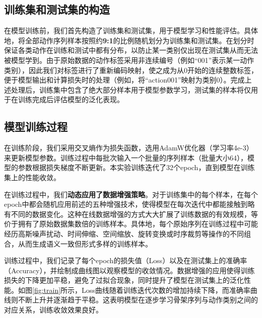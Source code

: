 \documentclass[UTF8]{article}
\begin{document}
\subsection{训练集和测试集的构造}

在模型训练前，我们首先构造了训练集和测试集，用于模型学习和性能评估。具体地，将全部动作序列样本按照约\textbf{9:1}的比例随机划分为训练集和测试集。在划分时保证各类动作在训练和测试中都有分布，以防止某一类别仅出现在测试集从而无法被模型学到。由于原始数据的动作标签采用非连续编号（例如``001''表示某一动作类别），因此我们对标签进行了重新编码映射，使之成为从0开始的连续整数标签，便于模型输出和计算损失时的处理（例如，将``action001''映射为类别0）。完成上述处理后，训练集中包含了绝大部分样本用于模型参数学习，测试集的样本将仅用于在训练完成后评估模型的泛化表现。

\subsection{模型训练过程}

在训练阶段，我们采用交叉熵作为损失函数，选用AdamW优化器（学习率4e-3）来更新模型参数。训练过程中每批次输入一个批量的序列样本（批量大小64），模型的参数根据损失梯度不断更新。本实验训练迭代了32个epoch，直到模型在训练集上的性能收敛。

在训练过程中，我们\textbf{动态应用了数据增强策略}。对于训练集中的每个样本，在每个epoch中都会随机应用前述的五种增强技术，使得模型在每次迭代中都能接触到略有不同的数据变化。这种在线数据增强的方式大大扩展了训练数据的有效规模，等价于拥有了原始数据集数倍的训练样本。具体地，每个原始序列在训练过程中可能经历高斯噪声扰动、时间伸缩、空间缩放、旋转变换或时序裁剪等操作的不同组合，从而生成语义一致但形式多样的训练样本。

训练过程中，我们记录了每个epoch的损失值（Loss）以及在测试集上的准确率（Accuracy），并绘制成曲线图以观察模型的收敛情况。数据增强的应用使得训练损失的下降更加平稳，避免了过拟合现象，同时提升了模型在测试集上的泛化性能。如图\ref{fig:train}所示，Loss曲线随着训练迭代次数的增加持续下降，而准确率曲线则不断上升并逐渐趋于平稳。这表明模型在逐步学习骨架序列与动作类别之间的对应关系，训练收敛效果良好。
\end{document}
